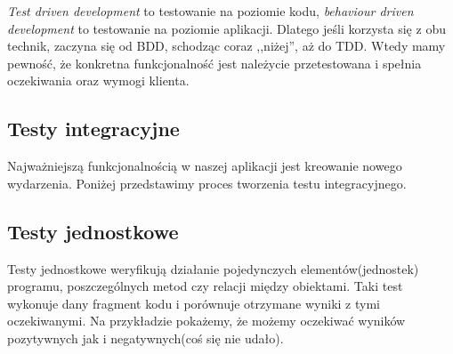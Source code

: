 \begin{itemize}
        \emph{Test driven development} to testowanie na poziomie kodu, \emph{behaviour driven development} to testowanie na poziomie aplikacji. Dlatego jeśli korzysta się z obu technik, zaczyna się od BDD, schodząc coraz ,,niżej'', aż do TDD. Wtedy mamy pewność, że konkretna funkcjonalność jest należycie przetestowana i spełnia oczekiwania oraz wymogi klienta.
    \end{itemize}

  \subsection{Testy integracyjne}
    Najważniejszą funkcjonalnością w naszej aplikacji jest kreowanie nowego wydarzenia. Poniżej przedstawimy proces tworzenia testu integracyjnego.

    
  \subsection{Testy jednostkowe}
    Testy jednostkowe weryfikują działanie pojedynczych elementów(jednostek) programu, poszczególnych metod czy relacji między obiektami. Taki test wykonuje dany fragment kodu i porównuje otrzymane wyniki z tymi oczekiwanymi. Na przykładzie pokażemy, że możemy oczekiwać wyników pozytywnych jak i negatywnych(coś się nie udało).

    
